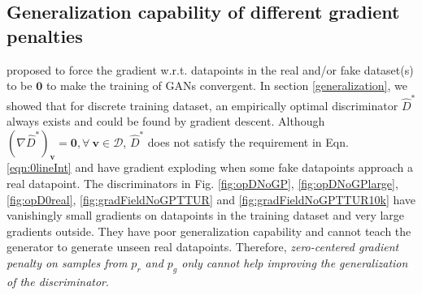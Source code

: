 \documentclass{article} %
\begin{document}
\subsection{Generalization capability of different gradient penalties} \label{gradPenGeneralization}
\cite{whichGANConverge} proposed to force the gradient w.r.t. datapoints in the real and/or fake dataset(s) to be $\bm 0$ to make the training of GANs convergent. %
In section \ref{generalization}, we showed that for discrete training dataset, an empirically optimal discriminator $\hat{D}^*$ always exists and could be found by gradient descent.
Although %
$(\nabla \hat{D}^*)_{\bm v} = \bm 0, \forall \ \bm v \in \mathcal{D}$, $\hat{D}^*$ does not satisfy the requirement in Eqn. \ref{eqn:0lineInt} and have gradient exploding when some fake datapoints approach a real datapoint. 
The discriminators in Fig. \ref{fig:opDNoGP}, \ref{fig:opDNoGPlarge}, \ref{fig:opD0real}, \ref{fig:gradFieldNoGPTTUR} and \ref{fig:gradFieldNoGPTTUR10k} have vanishingly small gradients on datapoints in the training dataset and very large gradients outside. They have poor generalization capability and cannot teach the generator to generate unseen real datapoints.
Therefore, \emph{zero-centered gradient penalty on samples from $p_r$ and $p_g$ only cannot help improving the generalization of the discriminator}. 
\end{document}
